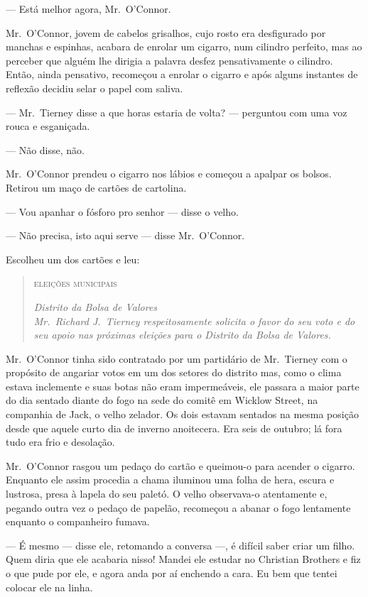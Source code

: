 --- Está melhor agora, Mr.~O’Connor.

Mr.~O’Connor, jovem de cabelos grisalhos, cujo rosto era desfigurado por
manchas e espinhas, acabara de enrolar um cigarro, num cilindro perfeito, mas
ao perceber que alguém lhe dirigia a palavra desfez pensativamente o cilindro.
Então, ainda pensativo, recomeçou a enrolar o cigarro e após alguns instantes
de reflexão decidiu selar o papel com saliva.

--- Mr.~Tierney disse a que horas estaria de volta? --- perguntou com uma voz
rouca e esganiçada.

--- Não disse, não.

Mr.~O’Connor prendeu o cigarro nos lábios e começou a apalpar os bolsos.
Retirou um maço de cartões de cartolina.

--- Vou apanhar o fósforo pro senhor --- disse o velho.

--- Não precisa, isto aqui serve --- disse Mr.~O’Connor.

Escolheu um dos cartões e leu:

\clearpage

\begin{quote}\centering
\textsc{eleições municipais}\smallskip

\textit{Distrito da Bolsa de Valores}\\
\textit{Mr.~Richard J.~Tierney respeitosamente solicita o favor do
seu voto e do seu apoio nas próximas eleições para o Distrito da
Bolsa de Valores.}
\end{quote}

Mr.~O’Connor tinha sido contratado por um partidário de Mr.~Tierney com o
propósito de angariar votos em um dos setores do distrito mas, como o clima
estava inclemente e suas botas não eram impermeáveis, ele passara a maior parte
do dia sentado diante do fogo na sede do comitê em Wicklow Street, na companhia
de Jack, o velho zelador.  Os dois estavam sentados na mesma posição desde que
aquele curto dia de inverno anoitecera.  Era seis de outubro; lá fora tudo era
frio e desolação.

Mr.~O’Connor rasgou um pedaço do cartão e queimou-o para acender o cigarro.
Enquanto ele assim procedia a chama iluminou uma folha de hera, escura e
lustrosa, presa à lapela do seu paletó.  O velho observava-o atentamente e,
pegando outra vez o pedaço de papelão, recomeçou a abanar o fogo lentamente
enquanto o companheiro fumava.

--- É mesmo --- disse ele, retomando a conversa ---, é difícil saber criar um
filho.  Quem diria que ele acabaria nisso!  Mandei ele estudar no Christian
Brothers e fiz o que pude por ele, e agora anda por aí enchendo a cara.  Eu bem
que tentei colocar ele na linha.

